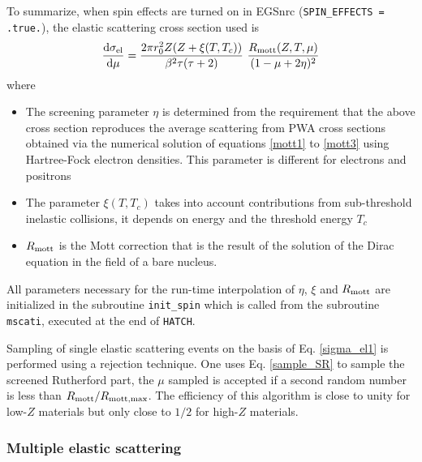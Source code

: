 To summarize, when spin effects are turned on in EGSnrc
({\tt SPIN\_EFFECTS = .true.}), the elastic scattering
cross section used is
\begin{equation}
\label{sigma_el1}
{{\rm d}\sigma_{\rm el} \over {\rm d}\mu} =
{2 \pi r_0^2 Z (Z + \xi(T,T_c)) \over
\beta^2 \tau (\tau + 2) }~{R_{\rm mott}(Z,T,\mu) \over (1 - \mu + 2 \eta)^2}
\end{equation}
where
\begin{itemize}
\item
The screening parameter $\eta$ is determined from the requirement
that the above cross section reproduces the average scattering
from PWA cross sections obtained via the numerical solution of
equations \eqref{mott1} to \eqref{mott3} using Hartree-Fock
electron densities. This parameter is different for electrons
and positrons
\item
The parameter $\xi(T,T_c)$ takes into account contributions
from sub-threshold inelastic collisions, it depends on energy
and the threshold energy $T_c$
\item
$R_{\rm mott}$ is the Mott correction that is the result of
the solution of the Dirac equation in the field of a bare nucleus.
\end{itemize}
All parameters necessary for the run-time interpolation
of $\eta$, $\xi$ and $R_{\rm mott}$ are initialized in
the subroutine {\tt init\_spin} which is called from
the subroutine {\tt mscati}, executed at the end of {\tt HATCH}.

Sampling of single elastic scattering events on the basis of
Eq. \eqref{sigma_el1} is performed using a rejection technique.
One uses Eq. \eqref{sample_SR} to sample the screened Rutherford
part, the $\mu$ sampled is accepted if a second random number is
less than $R_{\rm mott}/R_{\rm mott,max}$. The efficiency of
this algorithm is close to unity for low-$Z$ materials but
only close to $1/2$ for high-$Z$ materials.

\subsubsection{Multiple elastic scattering}
\label{sec_MS}
\setcounter{equation}{0}

